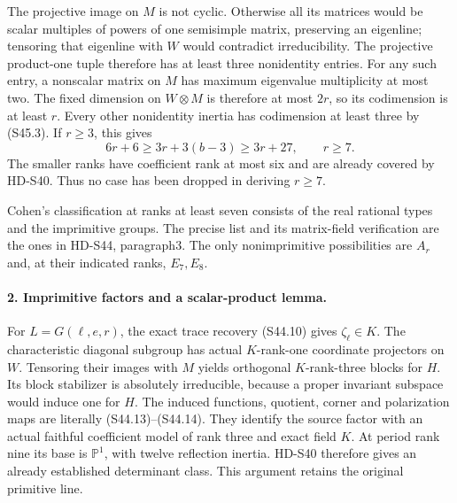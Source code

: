 The projective image on \(M\) is not cyclic. Otherwise
all its matrices would be scalar multiples of powers of
one semisimple matrix, preserving an eigenline; tensoring
that eigenline with \(W\) would contradict irreducibility.
The projective product-one tuple therefore has at least
three nonidentity entries. For any such entry, a nonscalar
matrix on \(M\) has maximum eigenvalue multiplicity at
most two. The fixed dimension on \(W\otimes M\) is
therefore at most \(2r\), so its codimension is at least
\(r\). Every other nonidentity inertia has codimension at
least three by (S45.3). If \(r\ge3\), this gives
\[
                 6r+6\ge3r+3(b-3)\ge3r+27,
                 \qquad r\ge7.                            \tag{S45.5}
\]
The smaller ranks have coefficient rank at most six and
are already covered by HD-S40. Thus no case has been
dropped in deriving \(r\ge7\).

Cohen's classification at ranks at least seven consists
of the real rational types and the imprimitive groups.
The precise list and its matrix-field verification are
the ones in HD-S44, paragraph3. The only nonimprimitive
possibilities are \(A_r\) and, at their indicated ranks,
\(E_7,E_8\).

\paragraph{2. Imprimitive factors and a scalar-product lemma.}
For \(L=G(\ell,e,r)\), the exact trace recovery (S44.10)
gives \(\zeta_\ell\in K\). The characteristic diagonal
subgroup has actual \(K\)-rank-one coordinate projectors
on \(W\). Tensoring their images with \(M\) yields
orthogonal \(K\)-rank-three blocks for \(H\).
Its block stabilizer is absolutely irreducible, because a
proper invariant subspace would induce one for \(H\).
The induced functions, quotient, corner and polarization maps
are literally (S44.13)--(S44.14). They identify the source
factor with an actual faithful coefficient model of rank
three and exact field \(K\). At period rank nine its
base is \(\mathbb P^1\), with twelve reflection inertia.
HD-S40 therefore gives an already established determinant
class. This argument retains the original primitive line.

